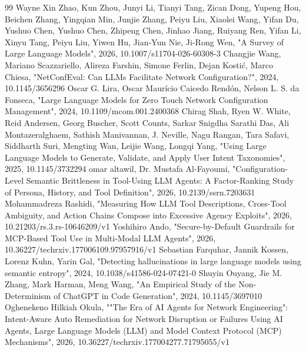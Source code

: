 \documentclass[conference]{IEEEtran}
\begin{document}
\begin{thebibliography}{99}
 Wayne Xin Zhao, Kun Zhou, Junyi Li, Tianyi Tang, Zican Dong, Yupeng Hou, Beichen Zhang, Yingqian Min, Junjie Zhang, Peiyu Liu, Xiaolei Wang, Yifan Du, Yushuo Chen, Yushuo Chen, Zhipeng Chen, Jinhao Jiang, Ruiyang Ren, Yifan Li, Xinyu Tang, Peiyu Liu, Yiwen Hu, Jian‐Yun Nie, Ji-Rong Wen, "A Survey of Large Language Models", 2026, 10.1007/s11704-026-60308-3
 Changjie Wang, Mariano Scazzariello, Alireza Farshin, Simone Ferlin, Dejan Kostić, Marco Chiesa, "NetConfEval: Can LLMs Facilitate Network Configuration?", 2024, 10.1145/3656296
 Oscar G. Lira, Oscar Maurício Caicedo Rendón, Nelson L. S. da Fonseca, "Large Language Models for Zero Touch Network Configuration Management", 2024, 10.1109/mcom.001.2400368
 Chirag Shah, Ryen W. White, Reid Andersen, Georg Buscher, Scott Counts, Sarkar Snigdha Sarathi Das, Ali Montazeralghaem, Sathish Manivannan, J. Neville, Nagu Rangan, Tara Safavi, Siddharth Suri, Mengting Wan, Leijie Wang, Longqi Yang, "Using Large Language Models to Generate, Validate, and Apply User Intent Taxonomies", 2025, 10.1145/3732294
 omar altawil, Dr. Mustafa Al-Fayoumi, "Configuration-Level Semantic Brittleness in Tool-Using LLM Agents: A Factor-Ranking Study of Persona, History, and Tool Definition", 2026, 10.2139/ssrn.7203631
 Mohammadreza Rashidi, "Measuring How LLM Tool Descriptions, Cross-Tool Ambiguity, and Action Chains Compose into Excessive Agency Exploits", 2026, 10.21203/rs.3.rs-10646209/v1
 Yoshihiro Ando, "Secure-by-Default Guardrails for MCP-Based Tool Use in Multi-Modal LLM Agents", 2026, 10.36227/techrxiv.177006109.97957916/v1
 Sebastian Farquhar, Jannik Kossen, Lorenz Kuhn, Yarin Gal, "Detecting hallucinations in large language models using semantic entropy", 2024, 10.1038/s41586-024-07421-0
 Shuyin Ouyang, Jie M. Zhang, Mark Harman, Meng Wang, "An Empirical Study of the Non-Determinism of ChatGPT in Code Generation", 2024, 10.1145/3697010
 Oghenekeno Hilkiah Okula, ""The Era of AI Agents for Network Engineering": Intent-Aware Auto Remediation for Network Disruption or Failures Using AI Agents, Large Language Models (LLM) and Model Context Protocol (MCP) Mechanisms", 2026, 10.36227/techrxiv.177004277.71795055/v1
\end{thebibliography}
\end{document}

